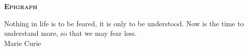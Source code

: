 
\vspace*{45pt}
\begin{flushleft}
	{\Large \textbf{\scshape{Epigraph}}}
\end{flushleft}
\vspace*{10pt}

\begin{flushright}
	Nothing in life is to be feared, it is only to be understood. Now is the time to understand more, so that we may fear less. \\
	Marie Curie
\end{flushright}

